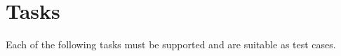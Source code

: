 \documentclass{article}
\begin{document}
\section{Tasks}
Each of the following tasks must be supported and are suitable as test cases.



\end{document}

